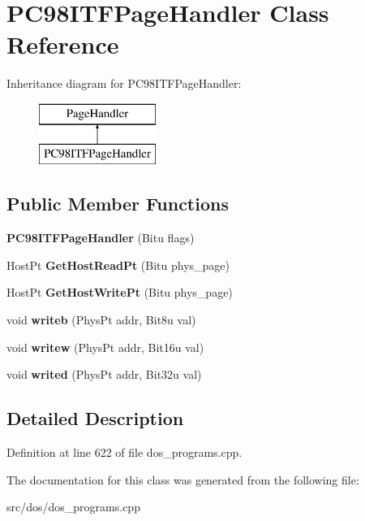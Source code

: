 \hypertarget{classPC98ITFPageHandler}{\section{P\-C98\-I\-T\-F\-Page\-Handler Class Reference}
\label{classPC98ITFPageHandler}
}
Inheritance diagram for P\-C98\-I\-T\-F\-Page\-Handler\-:\begin{figure}[H]
\begin{center}
\leavevmode
\includegraphics[height=2.000000cm]{classPC98ITFPageHandler}
\end{center}
\end{figure}
\subsection*{Public Member Functions}
\begin{DoxyCompactItemize}
\item 
\hypertarget{classPC98ITFPageHandler_a04944f2dfee9ee653ca0bfd4da327d72}{{\bfseries P\-C98\-I\-T\-F\-Page\-Handler} (Bitu flags)}\label{classPC98ITFPageHandler_a04944f2dfee9ee653ca0bfd4da327d72}

\item 
\hypertarget{classPC98ITFPageHandler_abc27a522e5012fb74276d27cc5d11c82}{Host\-Pt {\bfseries Get\-Host\-Read\-Pt} (Bitu phys\-\_\-page)}\label{classPC98ITFPageHandler_abc27a522e5012fb74276d27cc5d11c82}

\item 
\hypertarget{classPC98ITFPageHandler_a06c34515bcd91a529b3154bfc07204e7}{Host\-Pt {\bfseries Get\-Host\-Write\-Pt} (Bitu phys\-\_\-page)}\label{classPC98ITFPageHandler_a06c34515bcd91a529b3154bfc07204e7}

\item 
\hypertarget{classPC98ITFPageHandler_ae2282ea79d18dabcbc9f1ab7189dbdd2}{void {\bfseries writeb} (Phys\-Pt addr, Bit8u val)}\label{classPC98ITFPageHandler_ae2282ea79d18dabcbc9f1ab7189dbdd2}

\item 
\hypertarget{classPC98ITFPageHandler_a63aa204dc91f52298a4a0134488c80e0}{void {\bfseries writew} (Phys\-Pt addr, Bit16u val)}\label{classPC98ITFPageHandler_a63aa204dc91f52298a4a0134488c80e0}

\item 
\hypertarget{classPC98ITFPageHandler_a9d5683f0ea20ff690135bf269a627ba9}{void {\bfseries writed} (Phys\-Pt addr, Bit32u val)}\label{classPC98ITFPageHandler_a9d5683f0ea20ff690135bf269a627ba9}

\end{DoxyCompactItemize}


\subsection{Detailed Description}


Definition at line 622 of file dos\-\_\-programs.\-cpp.



The documentation for this class was generated from the following file\-:\begin{DoxyCompactItemize}
\item 
src/dos/dos\-\_\-programs.\-cpp\end{DoxyCompactItemize}
